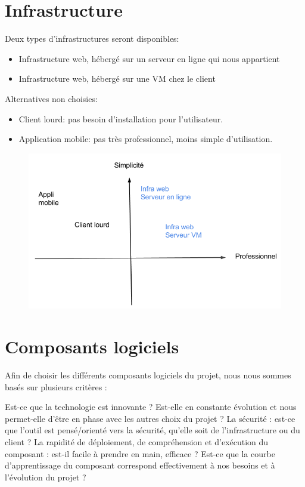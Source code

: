 \section{Infrastructure}
Deux types d'infrastructures seront disponibles:
\begin{itemize}
\item Infrastructure web, hébergé sur un serveur en ligne qui nous appartient
\item Infrastructure web, hébergé sur une VM chez le client\\
\end{itemize}

Alternatives non choisies:
\begin{itemize}
\item Client lourd: pas besoin d'installation pour l'utilisateur.
\item Application mobile: pas très professionnel, moins simple d'utilisation.
\end{itemize}

\begin{figure}[!h]
  \includegraphics[width=18cm]{choix-infra.png}
\end{figure}

\newpage


\section{Composants logiciels}
Afin de choisir les différents composants logiciels du projet, nous nous sommes basés sur plusieurs critères :

Est-ce que la technologie est innovante ? Est-elle en constante évolution et nous permet-elle d'être en phase avec les autres choix du projet ?
La sécurité : est-ce que l'outil est pensé/orienté vers la sécurité, qu'elle soit de l'infrastructure ou du client ?
La rapidité de déploiement, de compréhension et d'exécution du composant : est-il facile à prendre en main, efficace ? Est-ce que la courbe d'apprentissage du composant correspond effectivement à nos besoins et à l'évolution du projet ?

